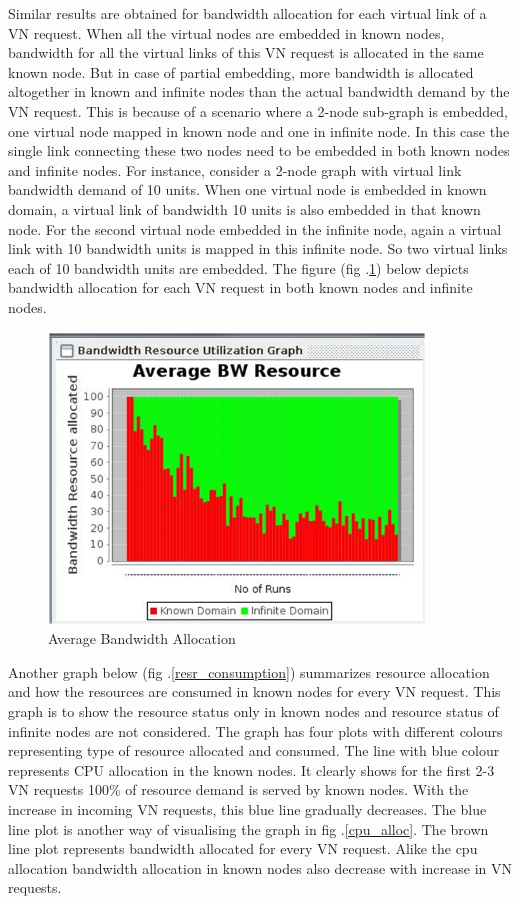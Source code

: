 \documentclass[article,dr=phil,type=msc ,colorback,accentcolor=tud4b]{tudthesis}
\begin{document}
Similar results are obtained for bandwidth allocation for each virtual link of a VN request. When all the virtual nodes are embedded in known nodes, bandwidth for all the virtual links of this VN request is allocated in the same known node. But in case of partial embedding, more bandwidth is allocated altogether in known and infinite nodes than the actual bandwidth demand by the VN request. This is because of a scenario where a 2-node sub-graph is embedded, one virtual node mapped in known node and one in infinite node. In this case the single link connecting these two nodes need to be embedded in both known nodes and infinite nodes. For instance, consider a 2-node graph with virtual link bandwidth demand of 10 units. When one virtual node is embedded in known domain, a virtual link of bandwidth 10 units is also embedded in that known node. For the second virtual node embedded in the infinite node, again a virtual link with 10 bandwidth units is mapped in this infinite node. So two virtual links each of 10 bandwidth units are embedded. The figure (fig .\ref{BW_alloc}) below depicts bandwidth allocation for each VN request in both known nodes and infinite nodes.
\begin{figure}[h]
	\centering
	\includegraphics[width=10cm]{BW_PE.png}
	\caption{Average Bandwidth Allocation}
	\label{BW_alloc}
\end{figure}

Another graph below (fig .\ref{resr_consumption}) summarizes resource allocation and how the resources are consumed in known nodes for every VN request. This graph is to show the resource status only in known nodes and resource status of infinite nodes are not considered. The graph has four plots with different colours representing type of resource allocated and consumed. The line with blue colour represents CPU allocation in the known nodes. It clearly shows for the first 2-3 VN requests 100\% of resource demand is served by known nodes. With the increase in incoming VN requests, this blue line gradually decreases. The blue line plot is another way of visualising the graph in fig .\ref{cpu_alloc}. The brown line plot represents bandwidth allocated for every VN request. Alike the cpu allocation bandwidth allocation in known nodes also decrease with increase in VN requests. \newline 
\end{document}
